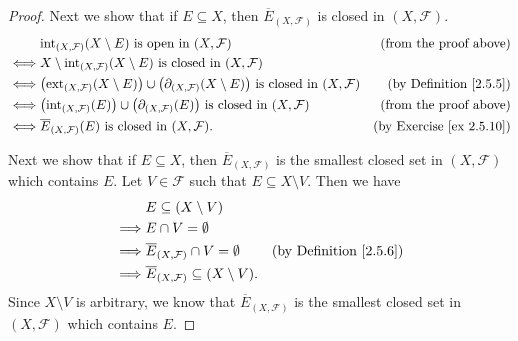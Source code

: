 \begin{proof}
    Next we show that if \(E \subseteq X\), then \(\overline{E}_{(X, \mathcal{F})}\) is closed in \((X, \mathcal{F})\).
    \begin{align*}
             & \text{int}_{(X, \mathcal{F})}(X \setminus E) \text{ is open in } (X, \mathcal{F})                                                                       & \text{(from the proof above)}        \\
        \iff & X \setminus \text{int}_{(X, \mathcal{F})}(X \setminus E) \text{ is closed in } (X, \mathcal{F})                                                                                                \\
        \iff & \big(\text{ext}_{(X, \mathcal{F})}(X \setminus E)\big) \cup \big(\partial_{(X, \mathcal{F})}(X \setminus E)\big) \text{ is closed in } (X, \mathcal{F}) & \text{(by Definition \ref{2.5.5})}   \\
        \iff & \big(\text{int}_{(X, \mathcal{F})}(E)\big) \cup \big(\partial_{(X, \mathcal{F})}(E)\big) \text{ is closed in } (X, \mathcal{F})                         & \text{(from the proof above)}        \\
        \iff & \overline{E}_{(X, \mathcal{F})}(E) \text{ is closed in } (X, \mathcal{F}).                                                                              & \text{(by Exercise \ref{ex 2.5.10})}
    \end{align*}

    Next we show that if \(E \subseteq X\), then \(\overline{E}_{(X, \mathcal{F})}\) is the smallest closed set in \((X, \mathcal{F})\) which contains \(E\).
    Let \(V \in \mathcal{F}\) such that \(E \subseteq X \setminus V\).
    Then we have
    \begin{align*}
                 & E \subseteq (X \setminus V)                                                                     \\
        \implies & E \cap V = \emptyset                                                                            \\
        \implies & \overline{E}_{(X, \mathcal{F})} \cap V = \emptyset         & \text{(by Definition \ref{2.5.6})} \\
        \implies & \overline{E}_{(X, \mathcal{F})} \subseteq (X \setminus V).
    \end{align*}
    Since \(X \setminus V\) is arbitrary, we know that \(\overline{E}_{(X, \mathcal{F})}\) is the smallest closed set in \((X, \mathcal{F})\) which contains \(E\).


\end{proof}
